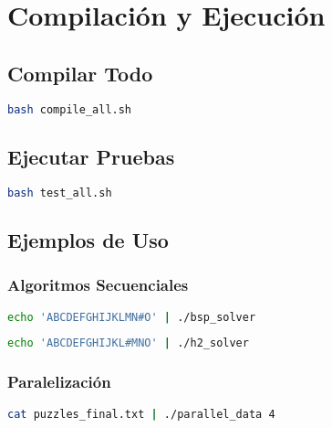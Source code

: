 \documentclass[12pt,a4paper]{article}
\begin{document}
\appendix

\section{Compilación y Ejecución}

\subsection{Compilar Todo}

\begin{lstlisting}[language=bash, caption=Compilación de todos los programas]
bash compile_all.sh
\end{lstlisting}

\subsection{Ejecutar Pruebas}

\begin{lstlisting}[language=bash, caption=Ejecución de suite de pruebas]
bash test_all.sh
\end{lstlisting}

\subsection{Ejemplos de Uso}

\subsubsection{Algoritmos Secuenciales}

\begin{lstlisting}[language=bash, caption=Ejecutar BFS]
echo 'ABCDEFGHIJKLMN#O' | ./bsp_solver
\end{lstlisting}

\begin{lstlisting}[language=bash, caption=Ejecutar A*-h2]
echo 'ABCDEFGHIJKL#MNO' | ./h2_solver
\end{lstlisting}

\subsubsection{Paralelización}

\begin{lstlisting}[language=bash, caption=Descomposición de datos con 4 hilos]
cat puzzles_final.txt | ./parallel_data 4
\end{lstlisting}
\end{document}
